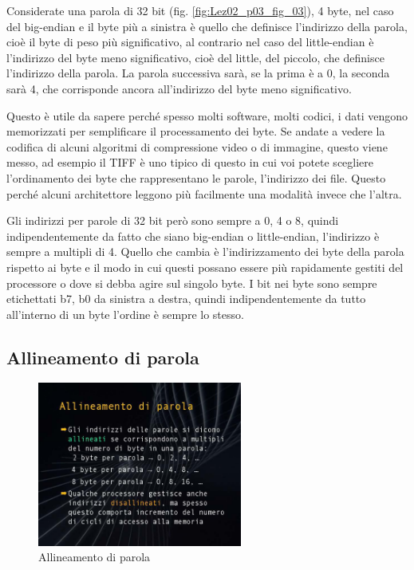 Considerate una parola di 32 bit (fig. \ref{fig:Lez02_p03_fig_03}), 4 byte, nel caso del big-endian e il byte più a sinistra è quello che definisce l'indirizzo della parola, cioè il byte di peso più significativo, al contrario nel caso del little-endian è l'indirizzo del byte meno significativo, cioè del little, del piccolo, che definisce l'indirizzo della parola.
La parola successiva sarà, se la prima è a 0, la seconda sarà 4, che corrisponde ancora all'indirizzo del byte meno significativo.

Questo è utile da sapere perché spesso molti software, molti codici, i dati vengono memorizzati per semplificare il processamento dei byte.
Se andate a vedere la codifica di alcuni algoritmi di compressione video o di immagine, questo viene messo, ad esempio il TIFF è uno tipico di questo in cui voi potete scegliere l'ordinamento dei byte che rappresentano le parole, l'indirizzo dei file. Questo perché alcuni architettore leggono più facilmente una modalità invece che l'altra.

Gli indirizzi per parole di 32 bit però sono sempre a 0, 4 o 8, quindi indipendentemente da fatto che siano big-endian o little-endian, l'indirizzo è sempre a multipli di 4.
Quello che cambia è l'indirizzamento dei byte della parola rispetto ai byte e il modo in cui questi possano essere più rapidamente gestiti del processore o dove si debba agire sul singolo byte.
I bit nei byte sono sempre etichettati b7, b0 da sinistra a destra, quindi indipendentemente da tutto all'interno di un byte l'ordine è sempre lo stesso.

\subsection{Allineamento di parola} 

\FloatBarrier
\begin{figure}[H]
  \centering
  \includegraphics[width=0.6\textwidth,
                    trim=40 40 45 40, %
                    clip]{images/Lez02_p03_fig_04.png}
  \caption{Allineamento di parola}
  \label{fig:Lez02_p03_fig_04}
\end{figure}
\FloatBarrier
\noindent

